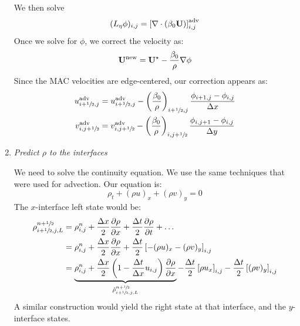 \begin{enumerate}
  We then solve
  \begin{equation}
    (L_\eta\phi)_{i,j} =
    \left [ \nabla \cdot (\beta_0 {\bf U}) \right ]_{i,j}^\mathrm{adv}
  \end{equation}
  Once we solve for $\phi$, we correct the velocity as:
  \begin{equation}
    {\bf U}^\mathrm{new} = {\bf U}^\star - \frac{\beta_0}{\rho} \nabla \phi
  \end{equation}
  Since the MAC velocities are edge-centered, our correction appears as:
  \begin{align}
    u^\mathrm{adv}_{i+{\sfrac{1}{2}},j} &= u^\mathrm{adv}_{i+{\sfrac{1}{2}},j} -
    \left (\frac{\beta_0}{\rho}\right )_{i+{\sfrac{1}{2}},j}
    \frac{\phi_{i+1,j} - \phi_{i,j}}{\Delta x} \\
    v^\mathrm{adv}_{i,j+{\sfrac{1}{2}}} &= v^\mathrm{adv}_{i,j+{\sfrac{1}{2}}} -
    \left (\frac{\beta_0}{\rho}\right )_{i,j+{\sfrac{1}{2}}}
    \frac{\phi_{i,j+1} - \phi_{i,j}}{\Delta y} 
  \end{align}
  
\item {\em Predict $\rho$ to the interfaces}

We need to solve the continuity equation.  We use the same techniques
that were used for advection.  Our equation is:
\begin{equation}
\rho_t + (\rho u)_x + (\rho v)_y = 0
\end{equation}
The $x$-interface left state would be:
\begin{align}
\rho_{i+\myhalf,j,L}^{n+\myhalf} &= \rho_{i,j}^n + 
   \frac{\Delta x}{2} \frac{\partial \rho}{\partial x} +
   \frac{\Delta t}{2} \frac{\partial \rho}{\partial t} + \ldots \nonumber \\
%
 &= \rho_{i,j}^n + 
    \frac{\Delta x}{2} \frac{\partial \rho}{\partial x} +
    \frac{\Delta t}{2} \left [ -(\rho u)_x -(\rho v)_y \right ]_{i,j} \nonumber\\
%
 &= \underbrace{\rho_{i,j}^n + 
   \frac{\Delta x}{2} \left ( 1 - \frac{\Delta t}{\Delta x} u_{i,j} \right )
        \frac{\partial \rho}{\partial x}}_{\hat{\rho}_{i+\myhalf,j,L}^{n+\myhalf}}
   - \frac{\Delta t}{2} \left [\rho u_x \right ]_{i,j} 
   - \frac{\Delta t}{2} \left [ (\rho v)_y \right ]_{i,j}
\end{align}
A similar construction would yield the right state at that interface, and the
$y$-interface states.


\end{enumerate}
